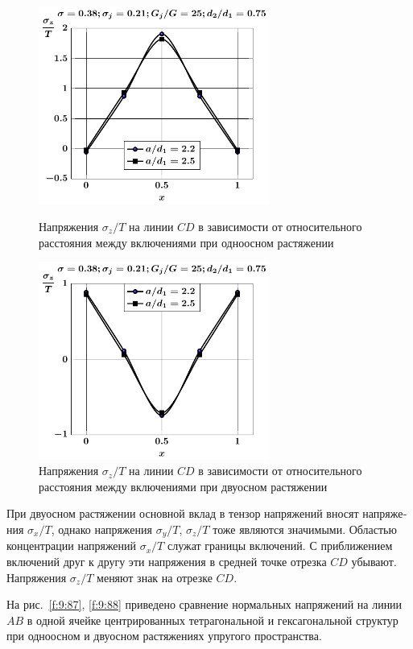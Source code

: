 \begin{russian}
\begin{figure}[h!]
\centering\footnotesize
\parbox[b]{7.5cm}{\centering\includegraphics[width=7.6cm]{inc13-a-d75-g25-t1-sig_z-cd.pdf}
\caption{Напряжения $\sigma_z/T$ на линии $CD$ в зависимости от относительного расстояния между включениями при одноосном растяжении
\label{f:9:85}}}\hfil\hfil
\parbox[b]{7.5cm}{\centering\includegraphics[width=7.6cm]{inc13-a-d75-g25-t2-sig_z-cd.pdf}
\caption{Напряжения $\sigma_z/T$ на линии $CD$ в зависимости от относительного расстояния между включениями при двуосном растяжении
\label{f:9:86}}}
\end{figure}

При двуосном растяжении основной вклад в тензор напряжений вносят напряжения $\sigma_x/T$, однако напряжения $\sigma_y/T$, $\sigma_z/T$ тоже являются значимыми. Областью концентрации напряжений $\sigma_x/T$ служат границы включений. С приближением включений друг к другу эти напряжения в средней точке отрезка $CD$ убывают. Напряжения $\sigma_z/T$ меняют знак на отрезке $CD$.

На рис.~\ref{f:9:87}, \ref{f:9:88} приведено сравнение нормальных напряжений на линии $AB$ в одной ячейке центрированных тетрагональной и гексагональной структур при одноосном и двуосном растяжениях упругого пространства.


\end{russian}
